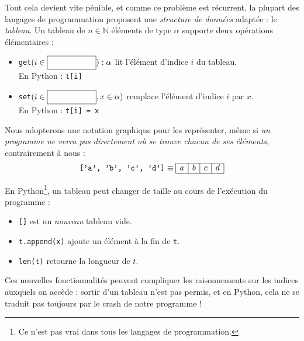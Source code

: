 Tout cela devient vite pénible, et comme ce problème est récurrent, la plupart
des langages de programmation proposent une \emph{structure de données}
adaptée : le \emph{tableau}.
Un tableau de $n\in\mathbb{N}$ éléments de type $\alpha$ supporte deux
opérations élémentaires :
\begin{itemize}
\item \texttt{get}$(i\in\pbox{$\{0\dots n-1\}$}) : \alpha$ lit l'élément
	d'indice $i$ du tableau. \\
	En Python : \texttt{t[i]}
\item \texttt{set}$(i\in\pbox{$\{0\dots n-1\}$}, x\in\alpha)$ remplace
	l'élément d'indice $i$ par $x$. \\
	En Python : \texttt{t[i] = x}
\end{itemize}

Nous adopterons une notation graphique pour les représenter, même si \emph{un
programme ne verra pas directement où se trouve chacun de ses éléments},
contrairement à nous :
\newcommand{\boxes}[4]{
	$\begin{array}{|l|l|l|l|}\hline
	\ptonly{#1} & \ptonly{#2} & \ptonly{#3} & \ptonly{#4} \\ \hline
	\end{array}$
}
\newcommand{\emptyboxes}{
	\boxes{\phantom{a}}{\phantom{a}}{\phantom{a}}{\phantom{a}}
}
\begin{equation*}
	\texttt{['a', 'b', 'c', 'd']} \equiv
	\begin{array}{|l|l|l|l|}\hline
		a & b & c & d \\ \hline
	\end{array}
\end{equation*}

En Python\footnote{Ce n'est pas vrai dans tous les langages de programmation.},
un tableau peut changer de taille au cours de l'exécution du programme :
\begin{itemize}
\item \texttt{[]} est un \emph{nouveau} tableau vide.
\item \texttt{t.append(x)} ajoute un élément à la fin de \texttt{t}.
\item \texttt{len(t)} retourne la longueur de $t$.
\end{itemize}

Ces nouvelles fonctionnalités peuvent compliquer les raisonnements sur les
indices auxquels on accède : sortir d'un tableau n'est pas permis, et en
Python, cela ne se traduit pas toujours par le crash de notre programme !

